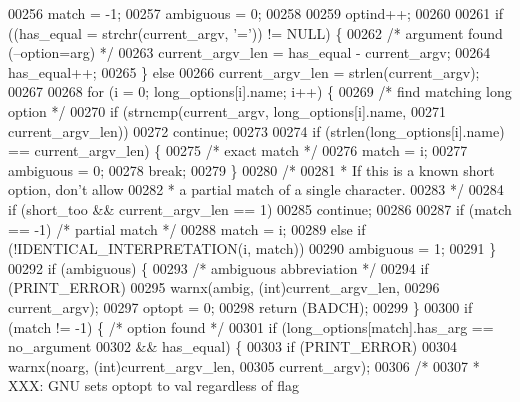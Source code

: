 \begin{DoxyCode}
{{{{{{{00256     match = -1;
00257     ambiguous = 0;
00258 
00259     optind++;
00260 
00261     \textcolor{keywordflow}{if} ((has\_equal = strchr(current\_argv, \textcolor{charliteral}{'='})) != NULL) \{
00262         \textcolor{comment}{/* argument found (--option=arg) */}
00263         current\_argv\_len = has\_equal - current\_argv;
00264         has\_equal++;
00265     \} \textcolor{keywordflow}{else}
00266         current\_argv\_len = strlen(current\_argv);
00267 
00268     \textcolor{keywordflow}{for} (i = 0; long\_options[i].name; i++) \{
00269         \textcolor{comment}{/* find matching long option */}
00270         \textcolor{keywordflow}{if} (strncmp(current\_argv, long\_options[i].name,
00271             current\_argv\_len))
00272             \textcolor{keywordflow}{continue};
00273 
00274         \textcolor{keywordflow}{if} (strlen(long\_options[i].name) == current\_argv\_len) \{
00275             \textcolor{comment}{/* exact match */}
00276             match = i;
00277             ambiguous = 0;
00278             \textcolor{keywordflow}{break};
00279         \}
00280         \textcolor{comment}{/*}
00281 \textcolor{comment}{         * If this is a known short option, don't allow}
00282 \textcolor{comment}{         * a partial match of a single character.}
00283 \textcolor{comment}{         */}
00284         \textcolor{keywordflow}{if} (short\_too && current\_argv\_len == 1)
00285             \textcolor{keywordflow}{continue};
00286 
00287         \textcolor{keywordflow}{if} (match == -1)    \textcolor{comment}{/* partial match */}
00288             match = i;
00289         \textcolor{keywordflow}{else} \textcolor{keywordflow}{if} (!IDENTICAL_INTERPRETATION(i, match))
00290             ambiguous = 1;
00291     \}
00292     \textcolor{keywordflow}{if} (ambiguous) \{
00293         \textcolor{comment}{/* ambiguous abbreviation */}
00294         \textcolor{keywordflow}{if} (PRINT_ERROR)
00295             warnx(ambig, (\textcolor{keywordtype}{int})current\_argv\_len,
00296                  current\_argv);
00297         optopt = 0;
00298         \textcolor{keywordflow}{return} (BADCH);
00299     \}
00300     \textcolor{keywordflow}{if} (match != -1) \{      \textcolor{comment}{/* option found */}
00301         \textcolor{keywordflow}{if} (long\_options[match].has_arg == no_argument
00302             && has\_equal) \{
00303             \textcolor{keywordflow}{if} (PRINT_ERROR)
00304                 warnx(noarg, (\textcolor{keywordtype}{int})current\_argv\_len,
00305                      current\_argv);
00306             \textcolor{comment}{/*}
00307 \textcolor{comment}{             * XXX: GNU sets optopt to val regardless of flag}
}}}}}}}
\end{DoxyCode}
